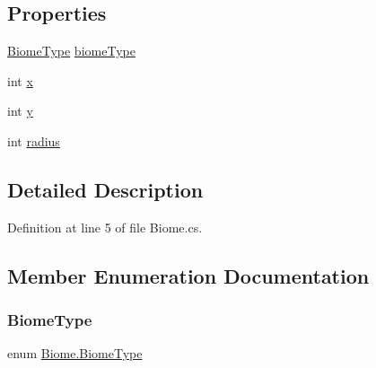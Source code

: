 \subsection*{Properties}
\begin{DoxyCompactItemize}
\item 
\mbox{\hyperlink{class_biome_a7ddcfcc6d4e88c5eb73df6827df862da}{Biome\+Type}} \mbox{\hyperlink{class_biome_a0b8fc33054a627c978fa9d81573a9e1d}{biome\+Type}}
\item 
int \mbox{\hyperlink{class_biome_ae63d1400ef2eaa0c520bec593aa2e90d}{x}}
\item 
int \mbox{\hyperlink{class_biome_a3793ddae113d9c2b545a2dc7c6b96f3a}{y}}
\item 
int \mbox{\hyperlink{class_biome_a71b951bc82d85f930f9c6135a79a2bbc}{radius}}
\end{DoxyCompactItemize}


\subsection{Detailed Description}


Definition at line 5 of file Biome.\+cs.



\subsection{Member Enumeration Documentation}
\mbox{\label{class_biome_a7ddcfcc6d4e88c5eb73df6827df862da}} 
\subsubsection{\texorpdfstring{BiomeType}{BiomeType}}
{\footnotesize\ttfamily enum \mbox{\hyperlink{class_biome_a7ddcfcc6d4e88c5eb73df6827df862da}{Biome.\+Biome\+Type}}\hspace{0.3cm}{\ttfamily [strong]}}

